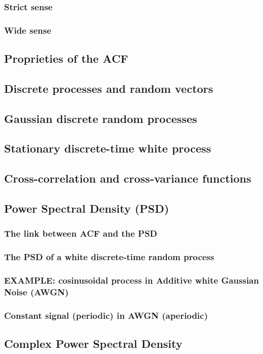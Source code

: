 \subsubsection{Strict sense}
\subsubsection{Wide sense}
\subsection{Proprieties of the ACF}
\subsection{Discrete processes and random vectors}
\subsection{Gaussian discrete random processes}
\subsection{Stationary discrete-time white process}
\subsection{Cross-correlation and cross-variance functions}
\subsection{Power Spectral Density (PSD)}
\subsubsection{The link between ACF and the PSD}
\subsubsection{The PSD of a white discrete-time random process}
\subsubsection{EXAMPLE: cosinusoidal process in Additive white Gaussian Noise (AWGN)}
\subsubsection{Constant signal (periodic) in AWGN (aperiodic)}
\subsection{Complex Power Spectral Density}
